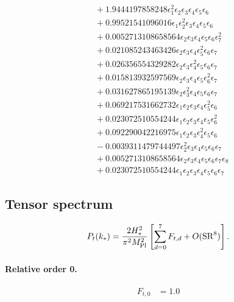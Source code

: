 \documentclass[10pt]{article}
\begin{document}
\begin{align*}
&{}  + 1.9444197858248 \epsilon_{1}^{2} \epsilon_{2} \epsilon_{3} \epsilon_{4} \epsilon_{5} \epsilon_{6} \\
&{}  + 0.99521541096016 \epsilon_{1} \epsilon_{2}^{2} \epsilon_{3} \epsilon_{4} \epsilon_{5} \epsilon_{6} \\
&{}  + 0.0052713108658564 \epsilon_{2} \epsilon_{3} \epsilon_{4} \epsilon_{5} \epsilon_{6} \epsilon_{7}^{2} \\
&{}  + 0.021085243463426 \epsilon_{2} \epsilon_{3} \epsilon_{4} \epsilon_{5}^{2} \epsilon_{6} \epsilon_{7} \\
&{}  + 0.026356554329282 \epsilon_{2} \epsilon_{3} \epsilon_{4}^{2} \epsilon_{5} \epsilon_{6} \epsilon_{7} \\
&{}  + 0.015813932597569 \epsilon_{2} \epsilon_{3} \epsilon_{4} \epsilon_{5} \epsilon_{6}^{2} \epsilon_{7} \\
&{}  + 0.031627865195139 \epsilon_{2} \epsilon_{3}^{2} \epsilon_{4} \epsilon_{5} \epsilon_{6} \epsilon_{7} \\
&{}  + 0.069217531662732 \epsilon_{1} \epsilon_{2} \epsilon_{3} \epsilon_{4} \epsilon_{5}^{2} \epsilon_{6} \\
&{}  + 0.023072510554244 \epsilon_{1} \epsilon_{2} \epsilon_{3} \epsilon_{4} \epsilon_{5} \epsilon_{6}^{2} \\
&{}  + 0.092290042216975 \epsilon_{1} \epsilon_{2} \epsilon_{3} \epsilon_{4}^{2} \epsilon_{5} \epsilon_{6} \\
&{}  - 0.0039311479744497 \epsilon_{2}^{2} \epsilon_{3} \epsilon_{4} \epsilon_{5} \epsilon_{6} \epsilon_{7} \\
&{}  + 0.0052713108658564 \epsilon_{2} \epsilon_{3} \epsilon_{4} \epsilon_{5} \epsilon_{6} \epsilon_{7} \epsilon_{8} \\
&{}  + 0.023072510554244 \epsilon_{1} \epsilon_{2} \epsilon_{3} \epsilon_{4} \epsilon_{5} \epsilon_{6} \epsilon_{7}
\end{align*}

\subsection{Tensor spectrum}
\[P_t(k_*)=\frac{2H_*^2}{\pi^2M_{\rm Pl}^2}\left[\sum_{d=0}^{7}F_{t,d}+O(\mathrm{SR}^{8})\right].\]
\paragraph{Relative order 0.}
\begin{align*}
F_{t,0} &= 1.0
\end{align*}
\end{document}

